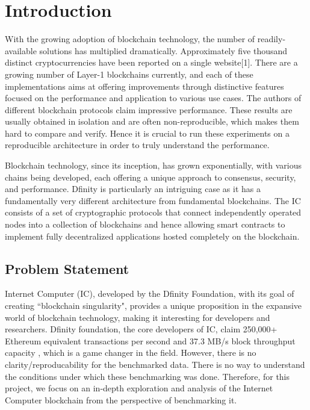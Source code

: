 \chapter{Introduction}
\label{chap:chaptertwo}


With the growing adoption of blockchain technology, the number of readily-available solutions has multiplied dramatically. 
Approximately five thousand distinct cryptocurrencies have been reported on a single website[1]. There are a growing 
number of Layer-1 blockchains currently, and each of these implementations aims at offering improvements through distinctive features 
focused on the performance and application to various use cases. The authors of different blockchain protocols claim impressive 
performance. These results are usually obtained in isolation and are often non-reproducible, which makes them hard to compare and 
verify. Hence it is crucial to run these experiments on a reproducible architecture in order to truly understand the performance.

Blockchain technology, since its inception, has grown exponentially, with various chains being developed, each offering a unique 
approach to consensus, security, and performance. Dfinity is particularly an intriguing case as it has a fundamentally very different 
architecture from fundamental blockchains. The IC consists of a set of cryptographic protocols that connect independently operated 
nodes into a collection of blockchains and hence allowing smart contracts to implement fully decentralized applications hosted 
completely on the blockchain.

\section{Problem Statement}

Internet Computer (IC), developed by the Dfinity Foundation, with its goal of creating ``blockchain singularity", provides a unique 
proposition in the expansive world of blockchain technology, making it interesting for developers and researchers. Dfinity 
foundation, the core developers of IC, claim 250,000+ Ethereum equivalent transactions per second and 37.3 MB/s block throughput 
capacity \cite{dfinitywebsite}, which is a game changer in the field. However, there is no clarity/reproducability for the 
benchmarked data. There is no way to understand the conditions under which these benchmarking was done. Therefore, for this project, 
we focus on an in-depth exploration and analysis of the Internet Computer blockchain from the perspective of benchmarking it.

